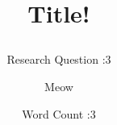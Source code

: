 \documentclass{article}
\title{Title!
\subtitle{Research Question :3}}
\author{Meow}
\date{Word Count :3}
\numberwithin{equation}{section}
\numberwithin{figure}{section}
\begin{document}
\clearpage\maketitle
\thispagestyle{empty}
\newpage

\tableofcontents
\newpage

\renewcommand{\thesection}{Section \Alph{section}}
\renewcommand{\thesubsection}{\Alph{section}.\arabic{subsection}}
\renewcommand{\thefigure}{\Alph{section}.\roman{figure}}

\pagestyle{fancy}
\fancyhf{}
\fancyhead[R]{\thepage}

\section{}


\section{}


\section{} 


\printbibliography
\end{document}
